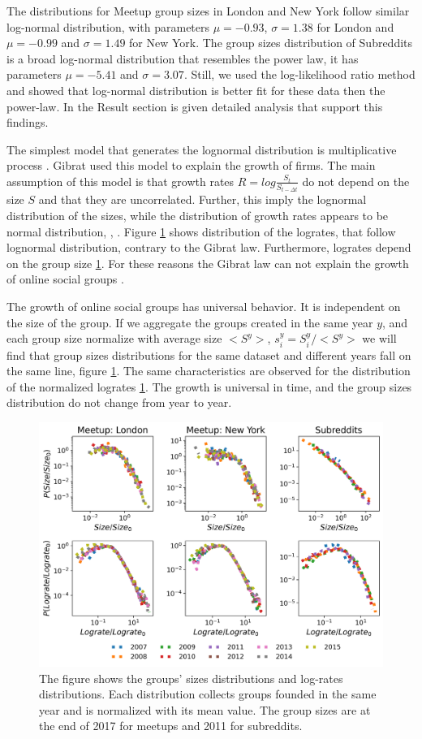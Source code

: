 The distributions for Meetup group sizes in London and New York follow similar log-normal distribution, with parameters $\mu= -0.93$, $\sigma = 1.38$ for London and $\mu=-0.99$ and $\sigma=1.49$ for New York. The group sizes distribution of Subreddits is a broad log-normal distribution that resembles the power law, it has parameters $\mu= -5.41$ and $\sigma = 3.07$.   Still, we used the log-likelihood ratio method and showed that log-normal distribution is better fit for these data then the power-law. In the Result section is given detailed analysis that support this findings.   

The simplest model that generates the lognormal distribution is multiplicative process \cite{mitzenmacher2004brief}. Gibrat used this model to explain the growth of firms. The main assumption of this model is that growth rates  $R = log\frac{S_t}{S_{t-\Delta t}}$ do not depend on the size $S$ and that they are uncorrelated. Further, this imply the lognormal distribution of the sizes, while the distribution of growth rates appears to be normal distribution,  \cite{mondani2014fat}, \cite{fu2005growth}. Figure \ref{fig:scale} shows distribution of the logrates, that follow lognormal distribution, contrary to the Gibrat law. Furthermore, logrates depend on the group size \ref{fig:scale}. For these reasons the Gibrat law can not explain the growth of online social groups \cite{frasco2014spatially, qian2014origin}.    

The growth of online social groups has universal behavior. It is independent on the size of the group. If we aggregate the groups created in the same year $y$, and each group size normalize with average size $<S^y>$, $s^{y}_{i}=S^{y}_{i}/<S^{y}>$ we will find that group sizes distributions for the same dataset and different years fall on the same line, figure \ref{fig:scale}. The same characteristics are observed for the distribution of the normalized logrates \ref{fig:scale}. The growth is universal in time, and the group sizes distribution do not change from year to year.




\begin{figure}[h]
	\centering
	\includegraphics[width=0.8\linewidth]{Figures/figures/Fig1.png}
	\caption{The figure shows the groups' sizes distributions and log-rates distributions. Each distribution collects groups founded in the same year and is normalized with its mean value. The group sizes are at the end of 2017 for meetups and 2011 for subreddits.}
	\label{fig:scale}
\end{figure}

